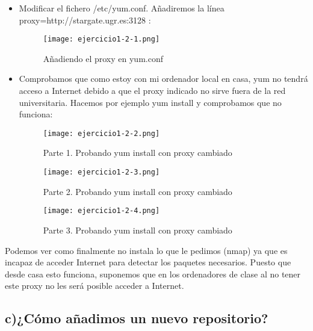 	\begin{itemize}
		\item Modificar el fichero /etc/yum.conf. Añadiremos la línea proxy=http://stargate.ugr.es:3128 :
			\begin{figure}[H] 
				\centering
				\texttt{[image: ejercicio1-2-1.png]} 
				\label{figura4} 
				\caption{Añadiendo el proxy en yum.conf}
			\end{figure}
		\item Comprobamos que como estoy con mi ordenador local en casa, yum no tendrá acceso a Internet debido a que el proxy indicado no sirve fuera de la red universitaria. Hacemos por ejemplo yum install y comprobamos que no funciona:
			\begin{figure}[H] 
				\centering
				\texttt{[image: ejercicio1-2-2.png]} 
				\label{figura5} 
				\caption{Parte 1. Probando yum install con proxy cambiado}
			\end{figure}
			
			\begin{figure}[H] 
				\centering
				\texttt{[image: ejercicio1-2-3.png]} 
				\label{figura6} 
				\caption{Parte 2. Probando yum install con proxy cambiado}
			\end{figure}
			
			\begin{figure}[H] 
				\centering
				\texttt{[image: ejercicio1-2-4.png]} 
				\label{figura7} 
				\caption{Parte 3. Probando yum install con proxy cambiado}
			\end{figure}	
	\end{itemize}
	
	Podemos ver como finalmente no instala lo que le pedimos (nmap) ya que es incapaz de acceder Internet para detectar los paquetes necesarios. Puesto que desde casa esto funciona, suponemos que en los ordenadores de clase al no tener este proxy no les será posible acceder a Internet.
	
	\subsection{c)¿Cómo añadimos un nuevo repositorio?}

